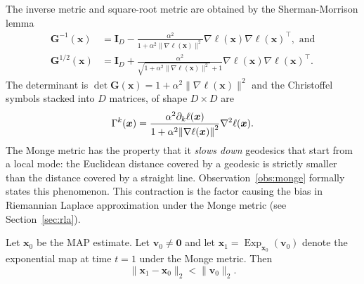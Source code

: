 The inverse metric and square-root metric are obtained by the Sherman-Morrison lemma
\begin{align*}
    \mathbf{G}^{-1}(\boldsymbol{x}) &= \mathbf{I}_D 
    - \frac{\alpha^2}{1+\alpha^2 \|\nabla \ell(\boldsymbol{x})\|^2} \nabla \ell(\boldsymbol{x}) \nabla \ell(\boldsymbol{x})^\top, \text{ and}\\
    \mathbf{G}^{1/2}(\boldsymbol{x})&= \mathbf{I}_D + \frac{\alpha^2}{\sqrt{1 + \alpha^2\|\nabla\ell(\boldsymbol{x})\|^2} + 1} \nabla\ell(\boldsymbol{x})\nabla\ell(\boldsymbol{x})^\top.
\end{align*}
The determinant is $\det \mathbf{G}(\boldsymbol{x}) = 1 + \alpha^2\|\nabla \ell(\boldsymbol{x})\|^2$ and the Christoffel symbols stacked into $D$ matrices, of shape $D\times D$ are
\begin{equation}
    \Gamma^{k}(\boldsymbol{x}) = \frac{\alpha^2 \partial_k \ell(\boldsymbol{x})}{1+\alpha^2\norm{\nabla\ell(\boldsymbol{x})}^2}\nabla^2\ell(\boldsymbol{x}). 
    \label{eq:christoffel_symbols_monge}
\end{equation}
The Monge metric has the property that it \emph{slows down} geodesics that start from a local mode: the Euclidean distance covered by a geodesic is strictly smaller than the distance covered by a straight line. Observation~\ref{obs:monge} formally states this phenomenon. This contraction is the factor causing the bias in Riemannian Laplace approximation under the Monge metric (see Section~\ref{sec:rla}).

\begin{observation} \label{obs:monge}
Let $\boldsymbol{x}_0$ be the MAP estimate. Let $\boldsymbol{v}_0 \neq \boldsymbol{0}$ and let 
$\boldsymbol{x}_1 = \operatorname{Exp}_{\boldsymbol{x}_0}(\boldsymbol{v}_0)$ denote the exponential
map at time $t=1$ under the Monge metric. Then
\begin{equation*}
    \|\boldsymbol{x}_1 - \boldsymbol{x}_0\|_2 < \|\boldsymbol{v}_0\|_2.
\end{equation*}
\end{observation}

